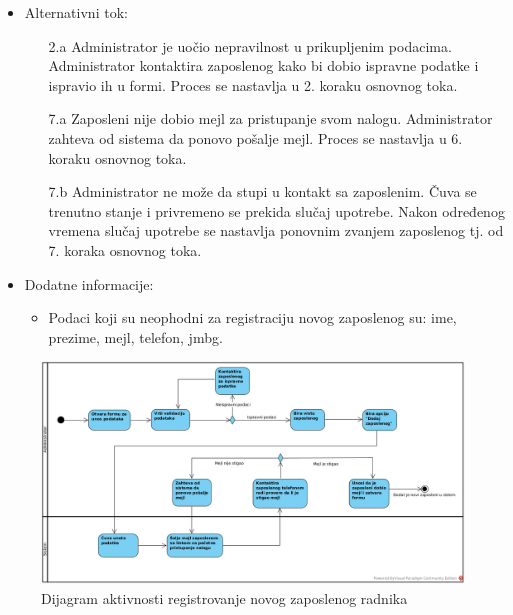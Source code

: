 \begin{itemize}
    \item Alternativni tok:
        \begin{itemize}
            \item[2.a] Administrator je uočio nepravilnost u prikupljenim podacima. Administrator kontaktira zaposlenog kako bi dobio ispravne podatke i ispravio ih u formi. Proces se nastavlja u 2. koraku osnovnog toka.
            \item[7.a] Zaposleni nije dobio mejl za pristupanje svom nalogu. Administrator zahteva od sistema da ponovo pošalje mejl. Proces se nastavlja u 6. koraku osnovnog toka.
            \item[7.b] Administrator ne može da stupi u kontakt sa zaposlenim. Čuva se trenutno stanje i privremeno se prekida slučaj upotrebe. Nakon određenog vremena slučaj upotrebe se nastavlja ponovnim zvanjem zaposlenog tj. od 7. koraka osnovnog toka.
        \end{itemize}
    \item Dodatne informacije:
        \begin{itemize}
            \item Podaci koji su neophodni za registraciju novog zaposlenog su: ime, prezime, mejl, telefon, jmbg.
        \end{itemize}
\end{itemize}

\begin{figure}[H]
\begin{center}
\includegraphics[width=\textwidth]{Pictures/activity_employee_registration.png}
\end{center}
    \caption{Dijagram aktivnosti registrovanje novog zaposlenog radnika}
\label{fig:ActivityEmployeeRegistration}
\end{figure}

